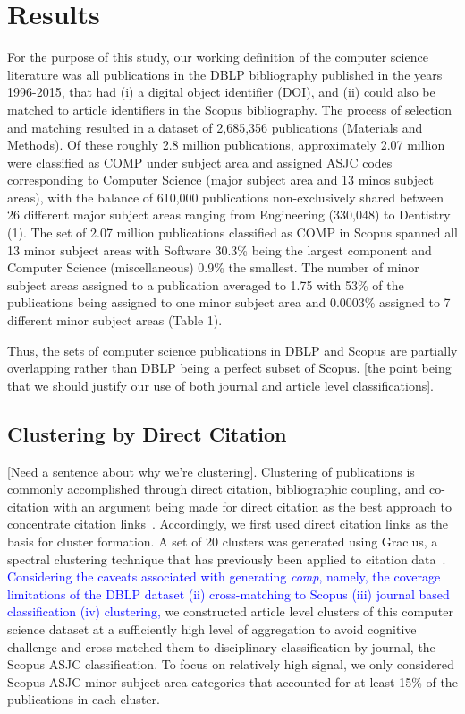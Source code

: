 \section*{Results}
\label{sec:results}

For the purpose of this study, our working definition of the computer science literature was all publications in the DBLP bibliography published in the years 1996-2015, that had (i) a digital object identifier (DOI), and (ii) could also be matched to article identifiers in the Scopus bibliography. The process of selection and matching resulted in a dataset of 2,685,356 publications (Materials and Methods). Of these roughly 2.8 million publications, approximately 2.07 million were classified as COMP under subject area and assigned ASJC codes corresponding to Computer Science (major subject area and 13 minos subject areas), with the balance of 610,000 publications non-exclusively shared between 26 different major subject areas ranging from Engineering (330,048) to Dentistry (1). The set of 2.07 million publications classified as COMP in Scopus spanned all 13 minor subject areas with Software 30.3\% being the largest component and Computer Science (miscellaneous) 0.9\% the smallest. The number of minor subject areas assigned to a publication averaged to 1.75 with 53\% of the publications being assigned to one minor subject area and 0.0003\% assigned to 7 different minor subject areas (Table 1).

Thus, the sets of computer science publications in DBLP and Scopus are partially overlapping rather than DBLP being a perfect subset of Scopus. [the point being that we should justify our use of both journal and article level classifications].

\subsection{Clustering by Direct Citation} [Need a sentence about why we're clustering].
Clustering of publications is commonly accomplished through direct citation, bibliographic coupling, and co-citation with an argument being made for direct citation as the best approach to concentrate citation links~\cite{klavans_which_2017}. Accordingly, we first used direct citation links as the basis for cluster formation. A set of 20 clusters was generated using Graclus, a spectral clustering technique that has previously been applied to citation data~\cite{graclus_2007,subelj_clustering_2016}. 
\textcolor{blue}{
Considering the caveats associated with generating \emph{comp}, namely, the coverage limitations of the DBLP dataset (ii) cross-matching to Scopus (iii) journal based classification (iv) clustering, }
we constructed article level clusters of this computer science dataset at a sufficiently high level of aggregation to avoid cognitive challenge and cross-matched them to disciplinary classification by journal, the Scopus ASJC classification. To focus on relatively high signal, we only considered Scopus ASJC minor subject area categories that accounted for at least 15\% of the publications in each cluster. 

